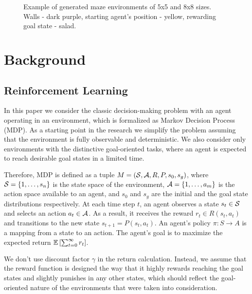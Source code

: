 \documentclass[runningheads]{llncs}
\begin{document}
\begin{figure}
  \centering
  \begin{minipage}{.49\linewidth}
    
  \end{minipage}
  \begin{minipage}{.49\linewidth}
    
  \end{minipage}
  \caption{Example of generated maze environments of 5x5 and 8x8 sizes. Walls - dark purple, starting agent's position - yellow, rewarding goal state - salad.} \label{fig_maze_examples}
\end{figure}

\section{Background}

\subsection{Reinforcement Learning}

In this paper we consider the classic decision-making problem with an agent operating in an environment, which is formalized as Markov Decision Process (MDP). As a starting point in the research we simplify the problem assuming that the environment is fully observable and deterministic. We also consider only environments with the distinctive goal-oriented tasks, where an agent is expected to reach desirable goal states in a limited time.

Therefore, MDP is defined as a tuple $M = (\mathcal{S}, \mathcal{A}, R, P, s_0, s_g)$, where $\mathcal{S} = \{1, \dots, s_n\}$ is the state space of the environment, $\mathcal{A} = \{1, \dots, a_m\}$ is the action space available to an agent, and $s_0$ and $s_g$ are the initial and the goal state distributions respectively. At each time step $t$, an agent observes a state $s_t \in \mathcal{S}$ and selects an action $a_t \in \mathcal{A}$. As a result, it receives the reward $r_t \in R(s_t, a_t)$ and transitions to the new state $s_{t+1} = P(s_t, a_t)$. An agent's policy $\pi: S \rightarrow A$ is a mapping from a state to an action. The agent's goal is to maximize the expected return $\mathbb{E} \left[ \sum_{t=0}^{\infty} r_t \right]$. 

We don't use discount factor $\gamma$ in the return calculation. Instead, we assume that the reward function is designed the way that it highly rewards reaching the goal states and slightly punishes in any other states, which should reflect the goal-oriented nature of the environments that were taken into consideration.
\end{document}
